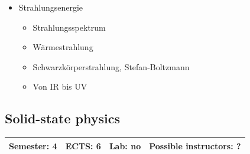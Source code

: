 \documentclass[12pt,twoside,fleqn,a4paper]{article}
\begin{document}
\begin{itemize}
\item Strahlungsenergie
\begin{itemize}
\item Strahlungsspektrum
\item Wärmestrahlung
\item Schwarzkörperstrahlung, Stefan-Boltzmann
\item Von IR bis UV
\end{itemize}
\end{itemize}


\subsection{Solid-state physics}
\begin{tabular}{llll} \hline
\textbf{Semester:} 4 & \textbf{ECTS:} 6 & \textbf{Lab:} no & \textbf{Possible instructors:} ?\\
\hline
\end{tabular}
\end{document}
